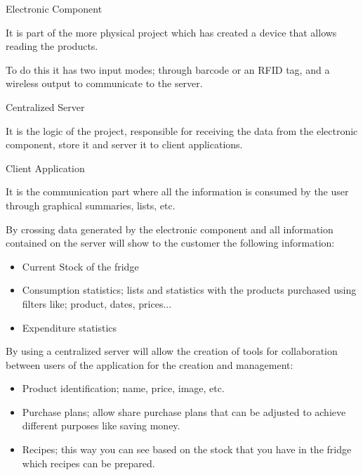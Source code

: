  \begin{description}
    \item Electronic Component

        It is part of the more physical project which has created a device that allows reading the products.

        To do this it has two input modes; through barcode or an RFID tag, and a wireless output to communicate to the server.

    \item Centralized Server

        It is the logic of the project, responsible for receiving the data from the electronic component, store it and server it to client applications.

    \item Client Application

            It is the communication part where all the information is consumed by the user through graphical summaries, lists, etc.

            By crossing data generated by the electronic component and all information contained on the server will show to the customer the following information:
            \begin{itemize}
                \item Current Stock of the fridge
                \item Consumption statistics; lists and statistics with the products purchased using filters like; product, dates, prices...
                \item Expenditure statistics
            \end{itemize}

            By using a centralized server will allow the creation of tools for collaboration between users of the application for the creation and management:

            \begin{itemize}
                \item Product identification; name, price, image, etc.
                \item Purchase plans; allow share purchase plans that can be adjusted to achieve different purposes like saving money.
                \item Recipes; this way you can see based on the stock that you have in the fridge which recipes can be prepared.
            \end{itemize}
\end{description}